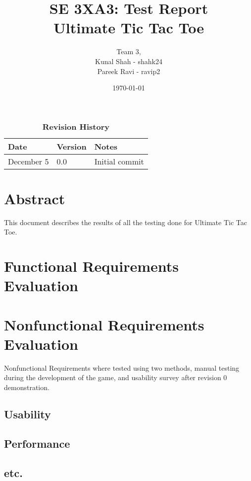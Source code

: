 \documentclass[12pt, titlepage]{article}
\title{SE 3XA3: Test Report\\Ultimate Tic Tac Toe}
\author{Team 3,
		\\ Kunal Shah - shahk24
		\\ Pareek Ravi - ravip2
}
\date{\today}
\begin{document}

\maketitle

\tableofcontents
\listoftables
\listoffigures

\newpage
\begin{table}[hp]
\caption{\bf Revision History}
\begin{tabularx}{\textwidth}{p{3cm}p{2cm}X}
\toprule {\bf Date} & {\bf Version} & {\bf Notes}\\
\midrule
December 5 & 0.0 & Initial commit\\
\bottomrule
\end{tabularx}
\end{table}

\newpage


\section*{Abstract}
This document describes the results of all the testing done for Ultimate Tic Tac Toe.

\section{Functional Requirements Evaluation}

\section{Nonfunctional Requirements Evaluation}
Nonfunctional Requirements where tested using two methods, manual testing during the development of the game, and usability survey
after revision 0 demonstration.
\subsection{Usability}
		
\subsection{Performance}

\subsection{etc.}
	
\end{document}
